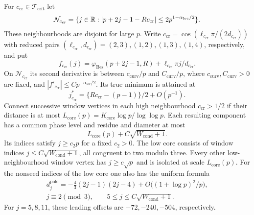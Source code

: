 \begin{lemma}\label{inf:critical-strips}
For $c_{\mathrm{cr}}\in\mathcal T_{\mathrm{crit}}$ let
\[
 \mathcal N_{c_{\mathrm{cr}}}
 =\{j\in\mathbb{R}:|p+2j-1-Rc_{\mathrm{cr}}|
                       \le2p^{1-\alpha_{\mathrm{loc}}/2}\}.
\]
These neighbourhoods are disjoint for large $p$.
Write $c_{\mathrm{cr}}=\cos(\ell_{c_{\mathrm{cr}}}\pi/(2d_{c_{\mathrm{cr}}}))$
with reduced pairs
$(\ell_{c_{\mathrm{cr}}},d_{c_{\mathrm{cr}}})=(2,3),(1,2),(1,3),(1,4)$,
respectively, and put
\[
 f_{c_{\mathrm{cr}}}(j)=\varphi_{\mathrm{Bes}}(p+2j-1,R)
                      +\ell_{c_{\mathrm{cr}}}\pi j/d_{c_{\mathrm{cr}}}.
\]
On $\mathcal N_{c_{\mathrm{cr}}}$ its second derivative is between
$c_{\mathrm{curv}}/p$ and $C_{\mathrm{curv}}/p$, where
$c_{\mathrm{curv}},C_{\mathrm{curv}}>0$ are fixed, and
$|f'_{c_{\mathrm{cr}}}|\le Cp^{-\alpha_{\mathrm{loc}}/2}$.
Its true minimum is attained at
\begin{equation}\label{inf:true-phase-minimum}
 j_{c_{\mathrm{cr}}}^*=\{Rc_{\mathrm{cr}}-(p-1)\}/2+O(p^{-1}).
\end{equation}
Connect successive window vertices in each high neighbourhood
$c_{\mathrm{cr}}>1/2$ if their distance is at most
$L_{\mathrm{core}}(p)=K_{\mathrm{core}}\log p/\log\log p$.
Each resulting component has a common phase level and residue and
diameter at most
\begin{equation}\label{inf:sharp-core-diameter}
 L_{\mathrm{core}}(p)+C\sqrt{W_{\mathrm{cond}}+1}.
\end{equation}
Its indices satisfy $j\ge c_2p$ for a fixed $c_2>0$.
The low core consists of window indices $j\le C\sqrt{W_{\mathrm{cond}}+1}$,
all congruent to two modulo three. Every other low-neighbourhood
window vertex has $j\ge c\sqrt p$ and is isolated at scale
$L_{\mathrm{core}}(p)$.
For the nonseed indices of the low core one also has the uniform formula
\begin{equation}\label{inf:low-core-offsets}
 \begin{gathered}
 d_j^{\mathrm{pole}}=-\frac43(2j-1)(2j-4)
             +O\bigl((1+\log p)^2/p\bigr),\\
 j\equiv2\pmod3,\qquad 5\le j\le C\sqrt{W_{\mathrm{cond}}+1}.
 \end{gathered}
\end{equation}
For $j=5,8,11$, these leading offsets are $-72,-240,-504$, respectively.
\end{lemma}

